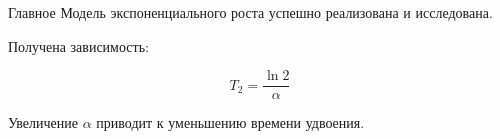 \documentclass[
  ignorenonframetext,
  aspectratio=169,
  russian,
]{beamer}
\begin{document}
\begin{frame}{Главное}
\protect{}\label{ux433ux43bux430ux432ux43dux43eux435}
Модель экспоненциального роста успешно реализована и исследована.

Получена зависимость:

\[
T_2=\frac{\ln 2}{\alpha}
\]

Увеличение \(\alpha\) приводит к уменьшению времени удвоения.
\end{frame}
\end{document}
